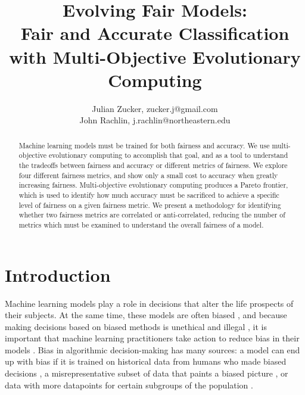 \documentclass{elsarticle}
\begin{document}
\title{\bf Evolving Fair Models: \\
Fair and Accurate Classification with Multi-Objective Evolutionary Computing}  

\author{Julian Zucker, zucker.j@gmail.com \\
John Rachlin, j.rachlin@northeastern.edu
}

\begin{abstract}
Machine learning models must be trained for both fairness and accuracy. We use multi-objective evolutionary computing to accomplish that goal, and as a tool to understand the tradeoffs between fairness and accuracy or different metrics of fairness. We explore four different fairness metrics, and show only a small cost to accuracy when greatly increasing fairness. Multi-objective evolutionary computing produces a Pareto frontier, which is used to identify how much accuracy must be sacrificed to achieve a specific level of fairness on a given fairness metric. We present a methodology for identifying whether two fairness metrics are correlated or anti-correlated, reducing the number of metrics which must be examined to understand the overall fairness of a model. 
\end{abstract}

\maketitle

\section{Introduction}
Machine learning models play a role in decisions that alter the life prospects of their subjects. At the same time, these models are often biased \citep{Angwin:2016}, and because making decisions based on biased methods is unethical and illegal \citep{Barocas:2016}, it is important that machine learning practitioners take action to reduce bias in their models \citep{Binns:2017}. Bias in algorithmic decision-making has many sources: a model can end up with bias if it is trained on historical data from humans who made biased decisions \citep{Calders:2013}, a misrepresentative subset of data that paints a biased picture \citep{Suresh:2019}, or data with more datapoints for certain subgroups of the population \citep{Torralba:2011}. 
\end{document}
